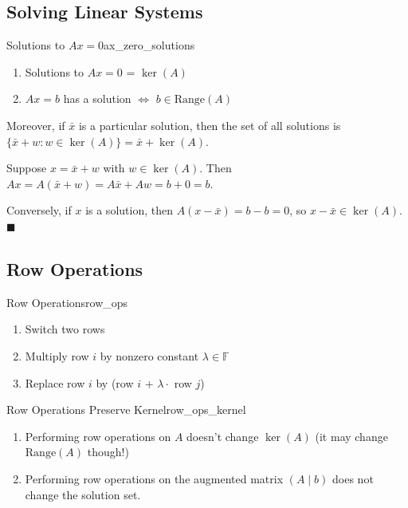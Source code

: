 \documentclass[11pt, letterpaper, openany]{book}
\renewenvironment{proof}[1][\proofname]{%
  \tcolorbox[blanker, breakable, left=1em,
    before skip=1em, after skip=1em,
    borderline west={2pt}{0pt}{MagicTeal!50},
    colback=MagicCream,
    before upper={\textcolor{MagicTeal}{\sffamily\bfseries #1.}\space}
  ]%
}{%
  \hfill\textcolor{MagicTeal}{\ensuremath{\blacksquare}}\endtcolorbox%
}
\begin{document}
\subsection{Solving Linear Systems}

\begin{lem}{Solutions to $Ax = 0$}{ax_zero_solutions}
\begin{enumerate}
    \item Solutions to $Ax = 0$ = $\ker(A)$
    \item $Ax = b$ has a solution $\Leftrightarrow$ $b \in \text{Range}(A)$
\end{enumerate}
Moreover, if $\bar{x}$ is a particular solution, then the set of all solutions is $\{\bar{x} + w : w \in \ker(A)\} = \bar{x} + \ker(A)$.
\end{lem}

\begin{proof}
Suppose $x = \bar{x} + w$ with $w \in \ker(A)$. Then $Ax = A(\bar{x} + w) = A\bar{x} + Aw = b + 0 = b$.

Conversely, if $x$ is a solution, then $A(x - \bar{x}) = b - b = 0$, so $x - \bar{x} \in \ker(A)$.
\end{proof}

\subsection{Row Operations}

\begin{defn}{Row Operations}{row_ops}
\begin{enumerate}
    \item[(R1)] Switch two rows
    \item[(R2)] Multiply row $i$ by nonzero constant $\lambda \in \mathbb{F}$
    \item[(R3)] Replace row $i$ by (row $i$ + $\lambda \cdot$ row $j$)
\end{enumerate}
\end{defn}

\begin{lem}{Row Operations Preserve Kernel}{row_ops_kernel}
\begin{enumerate}
    \item Performing row operations on $A$ doesn't change $\ker(A)$ (it may change $\text{Range}(A)$ though!)
    \item Performing row operations on the augmented matrix $(A \mid b)$ does not change the solution set.
\end{enumerate}
\end{lem}
\end{document}

